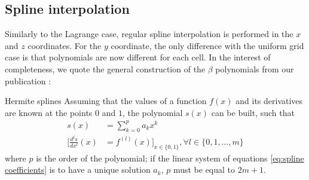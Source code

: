 \documentclass[11pt]{article}
\begin{document}
\subsection{Spline interpolation}
Similarly to the Lagrange case, regular spline interpolation is performed in the $x$ and $z$ coordinates.
For the $y$ coordinate, the only difference with the uniform grid case is that polynomials are now different for
each cell.
In the interest of completeness, we quote the general construction of the $\beta$ polynomials from our
publication \cite{channel_paper}:

\begin{small}
    \begin{paragraph}{Hermite splines}
        Assuming that the values of a function $f(x)$ and its derivatives are known at the points $0$ and $1$,
        the polynomial $s(x)$ can be built, such that
        \begin{align}
            s(x) &= \sum_{k = 0}^p a_k x^k \\
            \Biggr[\frac{d^l s}{dx^l} (x) &=
             f^{(l)}(x)\Biggr]_{x \in \{0, 1\}}, \forall l \in \{0, 1, \ldots, m\}
            \label{eq:spline coefficients}
        \end{align}
        where $p$ is the order of the polynomial; if the linear system of equations \eqref{eq:spline
        coefficients} is to have a unique solution $a_k$, $p$ must be equal to $2m+1$.


\end{paragraph}
\end{small}
\end{document}
